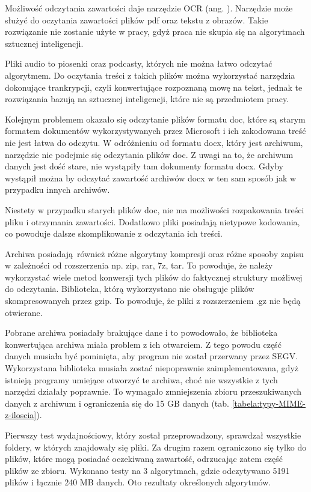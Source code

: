 Możliwość odczytania zawartości daje narzędzie OCR (ang. ).
Narzędzie może służyć do oczytania zawartości plików pdf oraz tekstu z obrazów.
Takie rozwiązanie nie zostanie użyte w pracy, gdyż praca nie skupia się na 
algorytmach sztucznej inteligencji.

Pliki audio to piosenki oraz podcasty, których nie można łatwo odczytać algorytmem.
Do oczytania treści z takich plików można wykorzystać narzędzia dokonujące 
trankrypcji, czyli konwertujące rozpoznaną mowę na tekst, jednak te rozwiązania bazują 
na sztucznej inteligencji, które nie są przedmiotem pracy.

Kolejnym problemem okazało się odczytanie plików formatu doc, które są starym 
formatem dokumentów wykorzystywanych przez Microsoft i ich zakodowana treść nie
jest łatwa do odczytu. W odróżnieniu od formatu docx, który jest archiwum, 
narzędzie nie podejmie się odczytania plików doc. Z uwagi na to, że archiwum danych
jest dość stare, nie wystąpiły tam dokumenty formatu docx. Gdyby wystąpił można
by odczytać zawartość archiwów docx w ten sam sposób jak w przypadku innych 
archiwów.

Niestety w przypadku starych plików doc, nie ma możliwości rozpakowania treści
pliku i otrzymania zawartości. Dodatkowo pliki posiadają nietypowe kodowania,
co powoduje dalsze skomplikowanie z odczytania ich treści.

Archiwa posiadają również różne algorytmy kompresji oraz różne sposoby zapisu w zależności od
rozszerzenia np. zip, rar, 7z, tar. To powoduje, że należy wykorzystać wiele
metod konwersji tych plików do faktycznej struktury możliwej do odczytania. 
Biblioteka, którą wykorzystano nie obsługuje plików skompresowanych przez gzip.
To powoduje, że pliki z rozszerzeniem .gz nie będą otwierane.

Pobrane archiwa posiadały brakujące dane i to powodowało, że biblioteka konwertująca
archiwa miała problem z ich otwarciem. Z tego powodu część danych musiała być 
pominięta, aby program nie został przerwany przez SEGV. Wykorzystana biblioteka
musiała zostać niepoprawnie zaimplementowana, gdyż istnieją programy umiejące 
otworzyć te archiwa, choć nie wszystkie z tych narzędzi działały poprawnie.
To wymagało zmniejszenia zbioru przeszukiwanych danych z archiwum i ograniczenia
się do 15 GB danych (tab. \ref{tabela:typy-MIME-z-iloscia}).




Pierwszy test wydajnościowy, który został przeprowadzony, sprawdzał wszystkie 
foldery, w których znajdowały się pliki. Za drugim razem ograniczono się tylko
do plików, które mogą posiadać oczekiwaną zawartość, odrzucając zatem część 
plików ze zbioru. Wykonano testy na 3 algorytmach, gdzie odczytywano 5191 plików 
i łącznie 240 MB danych. Oto rezultaty określonych algorytmów.

